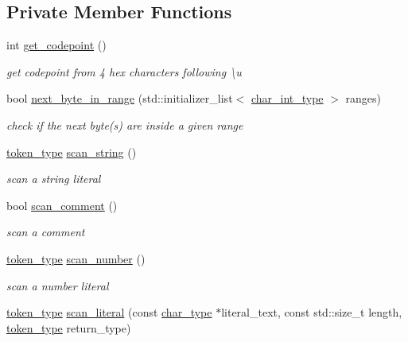 \subsection*{Private Member Functions}
\begin{DoxyCompactItemize}
\item 
int \hyperlink{classnlohmann_1_1detail_1_1lexer_adcf663a9878f58544790f1b6faad2e42}{get\+\_\+codepoint} ()
\begin{DoxyCompactList}\small\item\em get codepoint from 4 hex characters following {\ttfamily \textbackslash{}u} \end{DoxyCompactList}\item 
bool \hyperlink{classnlohmann_1_1detail_1_1lexer_af6fe701b8b3ca5f4a1b58db4658bdf87}{next\+\_\+byte\+\_\+in\+\_\+range} (std\+::initializer\+\_\+list$<$ \hyperlink{classnlohmann_1_1detail_1_1lexer_a46612a81a07dbbc6daef870ca4f959e4}{char\+\_\+int\+\_\+type} $>$ ranges)
\begin{DoxyCompactList}\small\item\em check if the next byte(s) are inside a given range \end{DoxyCompactList}\item 
\hyperlink{classnlohmann_1_1detail_1_1lexer__base_aa3538cce439a2de6c7893e627b38c454}{token\+\_\+type} \hyperlink{classnlohmann_1_1detail_1_1lexer_ab6352978e03ebcbc3cd618cd17142f26}{scan\+\_\+string} ()
\begin{DoxyCompactList}\small\item\em scan a string literal \end{DoxyCompactList}\item 
bool \hyperlink{classnlohmann_1_1detail_1_1lexer_afdc68706ad20be93977cd0f97043ea7f}{scan\+\_\+comment} ()
\begin{DoxyCompactList}\small\item\em scan a comment \end{DoxyCompactList}\item 
\hyperlink{classnlohmann_1_1detail_1_1lexer__base_aa3538cce439a2de6c7893e627b38c454}{token\+\_\+type} \hyperlink{classnlohmann_1_1detail_1_1lexer_aab51a28e32c1957329141baff8eda1c4}{scan\+\_\+number} ()
\begin{DoxyCompactList}\small\item\em scan a number literal \end{DoxyCompactList}\item 
\hyperlink{classnlohmann_1_1detail_1_1lexer__base_aa3538cce439a2de6c7893e627b38c454}{token\+\_\+type} \hyperlink{classnlohmann_1_1detail_1_1lexer_ad89dec0ac0f4e851925a0499e043b18b}{scan\+\_\+literal} (const \hyperlink{classnlohmann_1_1detail_1_1lexer_a98c69ad433d971104288baef813b2c68}{char\+\_\+type} $\ast$literal\+\_\+text, const std\+::size\+\_\+t length, \hyperlink{classnlohmann_1_1detail_1_1lexer__base_aa3538cce439a2de6c7893e627b38c454}{token\+\_\+type} return\+\_\+type)

\end{DoxyCompactItemize}
